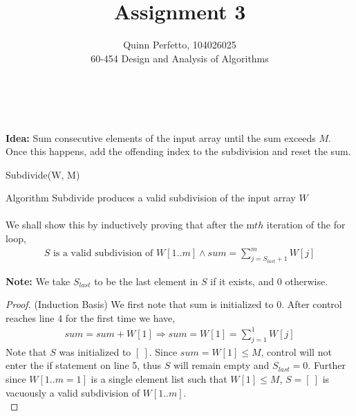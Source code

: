 \documentclass[12pt]{article}
\newenvironment{lemma}[2][Lemma]{\begin{trivlist}
\item[\hskip \labelsep {\bfseries #1}\hskip \labelsep {\bfseries #2.}]}{\end{trivlist}}
\newenvironment{question}[2][Question]{\begin{trivlist}
\item[\hskip \labelsep {\bfseries #1}\hskip \labelsep {\bfseries #2.}]}{\end{trivlist}}
\begin{document}
\title{Assignment 3}%
\author{Quinn Perfetto, 104026025\\ %
 60-454 Design and Analysis of Algorithms} %

\maketitle

\begin{question}{1 (a)}
  \leavevmode \\ \\
  \textbf{Idea:} Sum consecutive elements of the input array until the sum
  exceeds $M$.  Once this happens, add the offending index to the subdivision
  and reset the sum. \\
  \begin{algorithm}[H]
    \caption{Subdivide(W, M)}
    \BlankLine

  \end{algorithm}

  \begin{lemma}{1.1} Algorithm Subdivide produces a valid subdivision of the input array $W$
    \leavevmode \\ \\
    We shall show this by inductively proving that after the m$th$ iteration
    of the for loop,
    \begin{align*}
      S \text{ is a valid subdivision of } W[1..m] \land sum = \sum_{j=S_{last} + 1}^{m} W[j]
    \end{align*}

    \textbf{Note:} We take $S_{last}$ to be the last element in $S$ if it exists,
    and 0 otherwise. \\

    \begin{proof}
      (Induction Basis) We first note that sum is initialized to 0.  After
      control reaches line 4 for the first time we have,
      \begin{align*}
        sum = sum + W[1] \Rightarrow sum = W[1] = \sum_{j=1}^{1} W[j]
      \end{align*}
      Note that $S$ was initialized to $[\ ]$.  Since $sum = W[1] \leq M$, control
      will not enter the if statement on line 5, thus $S$ will remain empty and
      $S_{last} = 0$.  Further since $W[1..m=1]$ is a single element list such that
      $W[1] \leq M$, $S = [\ ]$ is vacuously a valid subdivision of $W[1..m]$. \\


\end{proof}
\end{lemma}
\end{question}
\end{document}

